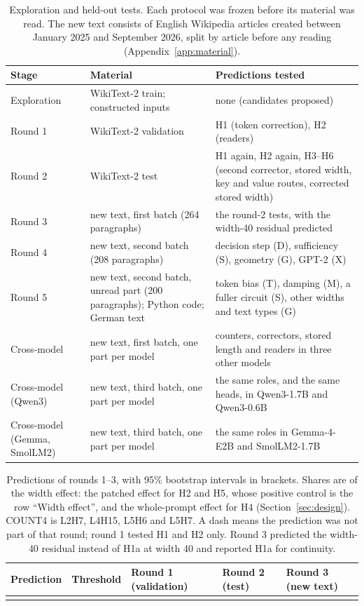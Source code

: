 \documentclass[11pt,a4paper]{article}
\begin{document}
\begin{table}[H]
\centering\small
\caption{Exploration and held-out tests. Each protocol was frozen before its material was read. The new text consists of English Wikipedia articles created between January 2025 and September 2026, split by article before any reading (Appendix~\ref{app:material}).}
\label{tab:rounds}
\begin{tabularx}{\textwidth}{@{}l P{5.2cm} L@{}}
\toprule
Stage & Material & Predictions tested \\
\midrule
Exploration & WikiText-2 train; constructed inputs & none (candidates proposed) \\
Round 1 & WikiText-2 validation & H1 (token correction), H2 (readers) \\
Round 2 & WikiText-2 test & H1 again, H2 again, H3--H6 (second corrector, stored width, key and value routes, corrected stored width) \\
Round 3 & new text, first batch (264 paragraphs) & the round-2 tests, with the width-40 residual predicted \\
Round 4 & new text, second batch (208 paragraphs) & decision step (D), sufficiency (S), geometry (G), GPT-2 (X) \\
Round 5 & new text, second batch, unread part (200 paragraphs); Python code; German text & token bias (T), damping (M), a fuller circuit (S), other widths and text types (G) \\
Cross-model & new text, first batch, one part per model & counters, correctors, stored length and readers in three other models \\
Cross-model (Qwen3) & new text, third batch, one part per model & the same roles, and the same heads, in Qwen3-1.7B and Qwen3-0.6B \\
Cross-model (Gemma, SmolLM2) & new text, third batch, one part per model & the same roles in Gemma-4-E2B and SmolLM2-1.7B \\
\bottomrule
\end{tabularx}
\end{table}

\begin{table}[!tp]
\centering\scriptsize
\caption{Predictions of rounds 1--3, with 95\% bootstrap intervals in brackets. Shares are of the width effect: the patched effect for H2 and H5, whose positive control is the row ``Width effect'', and the whole-prompt effect for H4 (Section~\ref{sec:design}). COUNT4 is L2H7, L4H15, L5H6 and L5H7. A dash means the prediction was not part of that round; round 1 tested H1 and H2 only. Round 3 predicted the width-40 residual instead of H1a at width 40 and reported H1a for continuity.}
\label{tab:rounds123}
\begin{tabularx}{\textwidth}{@{}L P{2.2cm} P{2.6cm} P{2.6cm} P{2.6cm}@{}}
\toprule
Prediction & Threshold & Round 1 (validation) & Round 2 (test) & Round 3 (new text) \\
\midrule
{}
\bottomrule
\end{tabularx}
\end{table}
\end{document}
